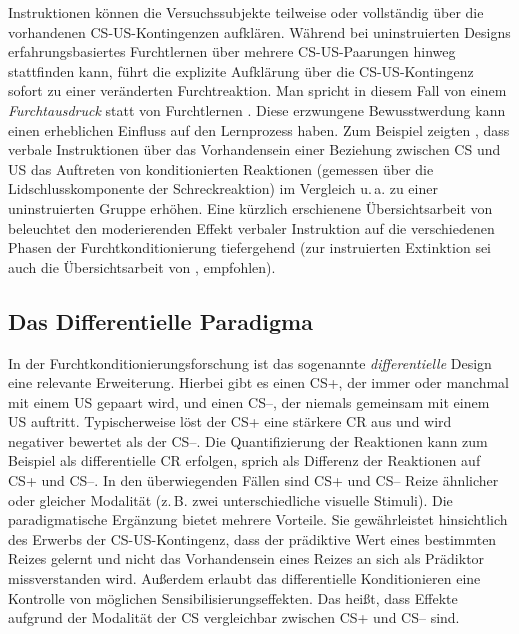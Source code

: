 		Instruktionen können die Versuchssubjekte teilweise oder vollständig über die vorhandenen CS-US-Kontingenzen aufklären. Während bei uninstruierten Designs erfahrungsbasiertes Furchtlernen über mehrere CS-US-Paarungen hinweg stattfinden kann, führt die explizite Aufklärung über die CS-US-Kontingenz sofort zu einer veränderten Furchtreaktion. Man spricht in diesem Fall von einem \textit{Furchtausdruck} statt von Furchtlernen \parencite{LONSDORF2017fc}. Diese erzwungene Bewusstwerdung kann einen erheblichen Einfluss auf den Lernprozess haben. Zum Beispiel zeigten \textcite{WEIDEMANN2016}, dass verbale Instruktionen über das Vorhandensein einer Beziehung zwischen CS und US das Auftreten von konditionierten Reaktionen (gemessen über die Lidschlusskomponente der Schreckreaktion) im Vergleich u.\,a. zu einer uninstruierten Gruppe erhöhen. Eine kürzlich erschienene Übersichtsarbeit von \textcite{MERTENS2018a} beleuchtet den moderierenden Effekt verbaler Instruktion auf die verschiedenen Phasen der Furchtkonditionierung tiefergehend (zur instruierten Extinktion sei auch die Übersichtsarbeit von , empfohlen). 
	
	
	
	\subsection{Das Differentielle Paradigma}	\label{differential}
	
		In der Furchtkonditionierungsforschung ist das sogenannte \textit{differentielle} Design eine relevante Erweiterung. Hierbei gibt es einen CS+, der immer oder manchmal mit einem US gepaart wird, und einen CS--, der niemals gemeinsam mit einem US auftritt. Typischerweise löst der CS+ eine stärkere CR aus und wird negativer bewertet als der CS--. Die Quantifizierung der Reaktionen kann zum Beispiel als differentielle CR erfolgen, sprich als Differenz der Reaktionen auf CS+ und CS--. In den überwiegenden Fällen sind CS+ und CS-- Reize ähnlicher oder gleicher Modalität (z.\,B. zwei unterschiedliche visuelle Stimuli). Die paradigmatische Ergänzung bietet mehrere Vorteile. Sie gewährleistet hinsichtlich des Erwerbs der CS-US-Kontingenz, dass der prädiktive Wert eines bestimmten Reizes gelernt und nicht das Vorhandensein eines Reizes an sich als Prädiktor missverstanden wird. Außerdem erlaubt das differentielle Konditionieren eine Kontrolle von möglichen Sensibilisierungseffekten. Das heißt, dass Effekte aufgrund der Modalität der CS vergleichbar zwischen CS+ und CS-- sind. 

